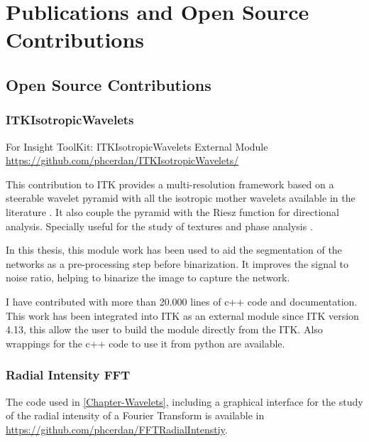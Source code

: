 \chapter{Publications and Open Source Contributions}

\label{Appendix-Contributions}


\section{Open Source Contributions}%
\label{sec:contributions}

\subsection{ITKIsotropicWavelets}%
\label{sub:contribution_itk}
For Insight ToolKit: ITKIsotropicWavelets External Module \url{https://github.com/phcerdan/ITKIsotropicWavelets/}

  This contribution to ITK provides a multi-resolution framework based on a steerable wavelet pyramid \cite{simoncelli_steerable_1995} with all the isotropic mother wavelets available in the literature \cite{held_steerable_2010, pad_vow:_2014}. It also couple the pyramid with the Riesz function \cite{chenouard_3d_2012} for directional analysis. Specially useful for the study of textures \cite{depeursinge_steerable_2017} and phase analysis \cite{held_steerable_2010}.

In this thesis, this module work has been used to aid the segmentation of the networks as a pre-processing step before binarization. It improves the signal to noise ratio, helping to binarize the image to capture the network.

I have contributed with more than 20.000 lines of c++ code and documentation. This work has been
integrated into ITK as an external module since ITK version 4.13, this allow the user to build the module directly from the ITK.
Also wrappings for the c++ code to use it from python are available.

\subsection{Radial Intensity FFT}%
\label{sub:radial_intensity_fft}
The code used in \autoref{Chapter-Wavelets}, including a graphical interface for the study of the radial intensity of a Fourier Transform
is available in \url{https://github.com/phcerdan/FFTRadialIntenstiy}.

